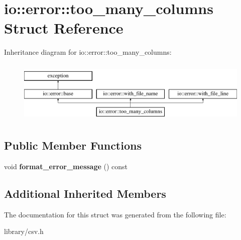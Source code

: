 \hypertarget{structio_1_1error_1_1too__many__columns}{}\section{io\+:\+:error\+:\+:too\+\_\+many\+\_\+columns Struct Reference}
\label{structio_1_1error_1_1too__many__columns}
Inheritance diagram for io\+:\+:error\+:\+:too\+\_\+many\+\_\+columns\+:\begin{figure}[H]
\begin{center}
\leavevmode
\includegraphics[height=3.000000cm]{structio_1_1error_1_1too__many__columns}
\end{center}
\end{figure}
\subsection*{Public Member Functions}
\begin{DoxyCompactItemize}
\item 
\mbox{\label{structio_1_1error_1_1too__many__columns_a2072af07b0408387579becc076a9809e}} 
void {\bfseries format\+\_\+error\+\_\+message} () const
\end{DoxyCompactItemize}
\subsection*{Additional Inherited Members}


The documentation for this struct was generated from the following file\+:\begin{DoxyCompactItemize}
\item 
library/csv.\+h\end{DoxyCompactItemize}
